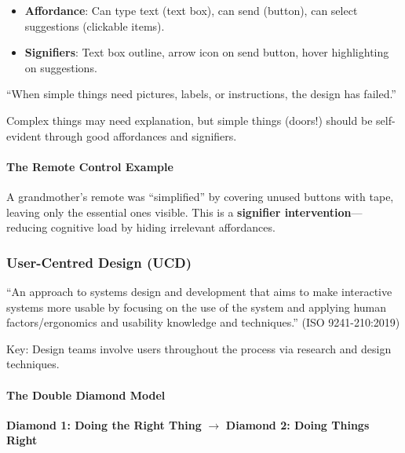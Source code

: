 \begin{exbox}
\begin{itemize}
  \item \textbf{Affordance}: Can type text (text box), can send (button), can select suggestions (clickable items).
  \item \textbf{Signifiers}: Text box outline, arrow icon on send button, hover highlighting on suggestions.
\end{itemize}
\end{exbox}

\begin{tipbox}
``When simple things need pictures, labels, or instructions, the design has failed.''

Complex things may need explanation, but simple things (doors!) should be self-evident through good affordances and signifiers.
\end{tipbox}

\paragraph*{The Remote Control Example}
A grandmother's remote was ``simplified'' by covering unused buttons with tape, leaving only the essential ones visible. This is a \textbf{signifier intervention}---reducing cognitive load by hiding irrelevant affordances.

\subsubsection*{User-Centred Design (UCD)}

\begin{defbox}
``An approach to systems design and development that aims to make interactive systems more usable by focusing on the use of the system and applying human factors/ergonomics and usability knowledge and techniques.'' (ISO 9241-210:2019)

Key: Design teams involve users throughout the process via research and design techniques.
\end{defbox}

\paragraph*{The Double Diamond Model}

\begin{center}
\textbf{Diamond 1: Doing the Right Thing} $\to$ \textbf{Diamond 2: Doing Things Right}
\end{center}

